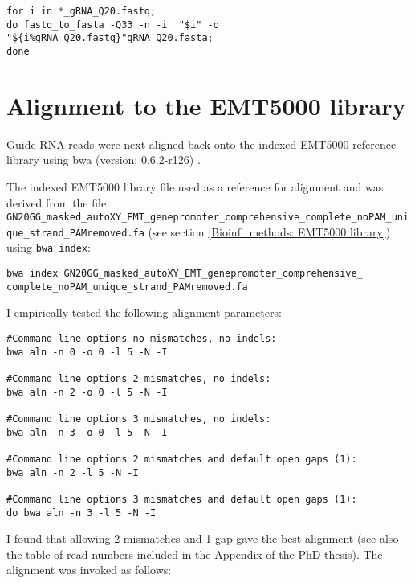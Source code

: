 \begin{small}\begin{lstlisting}
for i in *_gRNA_Q20.fastq;
do fastq_to_fasta -Q33 -n -i  "$i" -o "${i%gRNA_Q20.fastq}"gRNA_Q20.fasta;
done
\end{lstlisting}\end{small}

\section{Alignment to the EMT5000 library}

Guide RNA reads were next aligned back onto the indexed EMT5000 reference library using bwa (version: 0.6.2-r126) \cite{Li:2009fi}.

The indexed EMT5000 library file used as a reference for alignment and was derived from the file \verb|GN20GG_masked_autoXY_EMT_genepromoter_comprehensive_complete_noPAM_unique_strand_PAMremoved.fa| (see section \ref{Bioinf_methods: EMT5000 library}) using \verb|bwa index|:

\begin{small}\begin{lstlisting}
bwa index GN20GG_masked_autoXY_EMT_genepromoter_comprehensive_ complete_noPAM_unique_strand_PAMremoved.fa
\end{lstlisting}\end{small}

I empirically tested the following alignment parameters:

\begin{small}\begin{lstlisting}
#Command line options no mismatches, no indels:
bwa aln -n 0 -o 0 -l 5 -N -I

#Command line options 2 mismatches, no indels:
bwa aln -n 2 -o 0 -l 5 -N -I

#Command line options 3 mismatches, no indels:
bwa aln -n 3 -o 0 -l 5 -N -I

#Command line options 2 mismatches and default open gaps (1):
bwa aln -n 2 -l 5 -N -I  

#Command line options 3 mismatches and default open gaps (1):
do bwa aln -n 3 -l 5 -N -I
\end{lstlisting}\end{small}

I found that allowing 2 mismatches and 1 gap gave the best alignment (see also the table of read numbers included in the Appendix of the PhD thesis). The alignment was invoked as follows:

